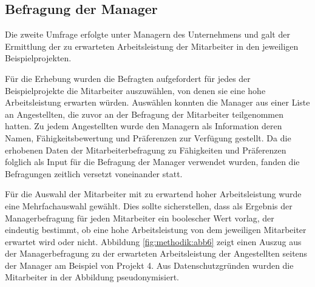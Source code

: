 
\subsection{Befragung der Manager}
\label{ch:methodik:datenerhebung:2}
Die zweite Umfrage erfolgte unter Managern des Unternehmens und galt der Ermittlung der zu erwarteten Arbeitsleistung der Mitarbeiter in den jeweiligen Beispielprojekten.

Für die Erhebung wurden die Befragten aufgefordert für jedes der Beispielprojekte die Mitarbeiter auszuwählen, von denen sie eine hohe Arbeitsleistung erwarten würden.
Auswählen konnten die Manager aus einer Liste an Angestellten, die zuvor an der Befragung der Mitarbeiter teilgenommen hatten.
Zu jedem Angestellten wurde den Managern als Information deren Namen, Fähigkeitsbewertung und Präferenzen zur Verfügung gestellt.
Da die erhobenen Daten der Mitarbeiterbefragung zu Fähigkeiten und Präferenzen folglich als Input für die Befragung der Manager verwendet wurden, fanden die Befragungen zeitlich versetzt voneinander statt.

Für die Auswahl der Mitarbeiter mit zu erwartend hoher Arbeitsleistung wurde eine Mehrfachauswahl gewählt.
Dies sollte sicherstellen, dass als Ergebnis der Managerbefragung für jeden Mitarbeiter ein boolescher Wert vorlag, der eindeutig bestimmt, ob eine hohe Arbeitsleistung von dem jeweiligen Mitarbeiter erwartet wird oder nicht.
Abbildung \ref{fig:methodik:abb6} zeigt einen Auszug aus der Managerbefragung zu der erwarteten Arbeitsleistung der Angestellten seitens der Manager am Beispiel von Projekt 4.
Aus Datenschutzgründen wurden die Mitarbeiter in der Abbildung pseudonymisiert.

